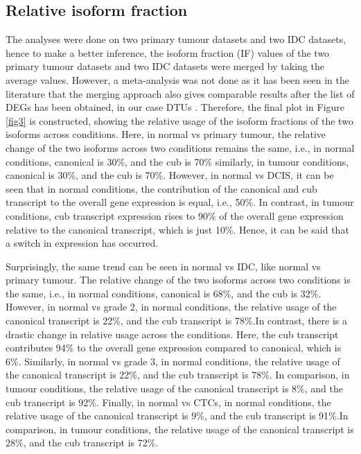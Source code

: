 \documentclass[fleqn,10pt,lineno]{wlpeerj}
\begin{document}
\subsection*{Relative isoform fraction}
The analyses were done on two primary tumour datasets and two IDC datasets, hence to make a better inference, the isoform fraction (IF) values of the two primary tumour datasets and two IDC datasets were merged by taking the average values. However, a meta-analysis was not done as it has been seen in the literature that the merging approach also gives comparable results after the list of DEGs has been obtained, in our case DTUs \citep{Taminau2014}. Therefore, the final plot in Figure \ref{fig3} is constructed, showing the relative usage of the isoform fractions of the two isoforms across conditions. Here, in normal vs primary tumour, the relative change of the two isoforms across two conditions remains the same, i.e., in normal conditions, canonical is 30\%, and the cub is 70\% similarly, in tumour conditions, canonical is 30\%, and the cub is 70\%. However, in normal vs DCIS, it can be seen that in normal conditions, the contribution of the canonical and cub transcript to the overall gene expression is equal, i.e., 50\%. In contrast, in tumour conditions, cub transcript expression rises to 90\% of the overall gene expression relative to the canonical transcript, which is just 10\%. Hence, it can be said that a switch in expression has occurred. 

Surprisingly, the same trend can be seen in normal vs IDC, like normal vs primary tumour. The relative change of the two isoforms across two conditions is the same, i.e., in normal conditions, canonical is 68\%, and the cub is 32\%. However, in normal vs grade 2, in normal conditions, the relative usage of the canonical transcript is 22\%, and the cub transcript is 78\%.In contrast, there is a drastic change in relative usage across the conditions. Here, the cub transcript contributes 94\% to the overall gene expression compared to canonical, which is 6\%. Similarly, in normal vs grade 3, in normal conditions, the relative usage of the canonical transcript is 22\%, and the cub transcript is 78\%. In comparison, in tumour conditions, the relative usage of the canonical transcript is 8\%, and the cub transcript is 92\%. Finally, in normal vs CTCs, in normal conditions, the relative usage of the canonical transcript is 9\%, and the cub transcript is 91\%.In comparison, in tumour conditions, the relative usage of the canonical transcript is 28\%, and the cub transcript is 72\%. 
\end{document}
